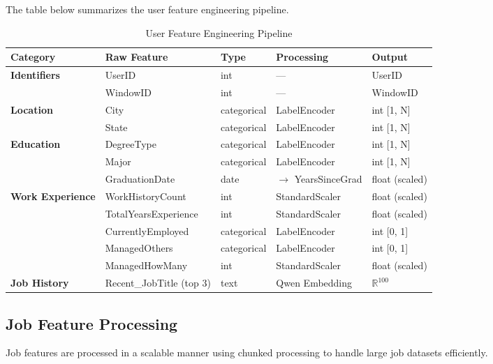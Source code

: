 The table below summarizes the user feature engineering pipeline.
\begin{table}[htbp]
    \centering
    \caption{User Feature Engineering Pipeline}
    \label{tab:user_features}
    \begin{tabular}{|l|l|l|l|l|}
        \hline
        \textbf{Category} & \textbf{Raw Feature} & \textbf{Type} & \textbf{Processing} & \textbf{Output} \\
        \hline
        \multirow{2}{*}{\textbf{Identifiers}} & UserID & int & --- & UserID \\
        & WindowID & int & --- & WindowID \\
        \hline
        \multirow{2}{*}{\textbf{Location}} & City & categorical & LabelEncoder & int [1, N] \\
        & State & categorical & LabelEncoder & int [1, N] \\
        \hline
        \multirow{3}{*}{\textbf{Education}} & DegreeType & categorical & LabelEncoder & int [1, N] \\
        & Major & categorical & LabelEncoder & int [1, N] \\
        & GraduationDate & date & $\rightarrow$ YearsSinceGrad & float (scaled) \\
        \hline
        \multirow{5}{*}{\textbf{Work Experience}} & WorkHistoryCount & int & StandardScaler & float (scaled) \\
        & TotalYearsExperience & int & StandardScaler & float (scaled) \\
        & CurrentlyEmployed & categorical & LabelEncoder & int [0, 1] \\
        & ManagedOthers & categorical & LabelEncoder & int [0, 1] \\
        & ManagedHowMany & int & StandardScaler & float (scaled) \\
        \hline
        \textbf{Job History} & Recent\_JobTitle (top 3) & text & Qwen Embedding & $\mathbb{R}^{100}$ \\
        \hline
    \end{tabular}
\end{table}

\subsection{Job Feature Processing}
\label{sec:job_features_processing}

Job features are processed in a scalable manner using chunked processing to handle large job datasets efficiently.

